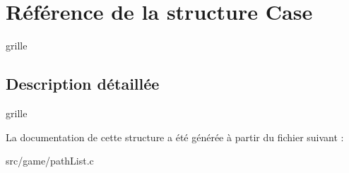 \hypertarget{structCase}{}\section{Référence de la structure Case}
\label{structCase}


grille  




\subsection{Description détaillée}
grille 

La documentation de cette structure a été générée à partir du fichier suivant \+:\begin{DoxyCompactItemize}
\item 
src/game/path\+List.\+c\end{DoxyCompactItemize}
